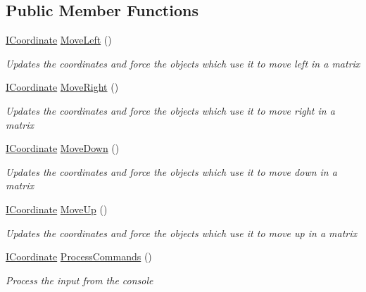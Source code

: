 \subsection*{Public Member Functions}
\begin{DoxyCompactItemize}
\item 
\hyperlink{interface_labyrinth_game_1_1_interfaces_1_1_i_coordinate}{I\+Coordinate} \hyperlink{class_labyrinth_game_1_1_keyboard_command_a19c4c43c956aabf2f1840410e8735cd3}{Move\+Left} ()
\begin{DoxyCompactList}\small\item\em Updates the coordinates and force the objects which use it to move left in a matrix \end{DoxyCompactList}\item 
\hyperlink{interface_labyrinth_game_1_1_interfaces_1_1_i_coordinate}{I\+Coordinate} \hyperlink{class_labyrinth_game_1_1_keyboard_command_a281fa60788d6778b7e157c202574db22}{Move\+Right} ()
\begin{DoxyCompactList}\small\item\em Updates the coordinates and force the objects which use it to move right in a matrix \end{DoxyCompactList}\item 
\hyperlink{interface_labyrinth_game_1_1_interfaces_1_1_i_coordinate}{I\+Coordinate} \hyperlink{class_labyrinth_game_1_1_keyboard_command_af0559dc6b293c70e92f4a49e946c23a3}{Move\+Down} ()
\begin{DoxyCompactList}\small\item\em Updates the coordinates and force the objects which use it to move down in a matrix \end{DoxyCompactList}\item 
\hyperlink{interface_labyrinth_game_1_1_interfaces_1_1_i_coordinate}{I\+Coordinate} \hyperlink{class_labyrinth_game_1_1_keyboard_command_affb746a49aaf2ace462d676046aae8e6}{Move\+Up} ()
\begin{DoxyCompactList}\small\item\em Updates the coordinates and force the objects which use it to move up in a matrix \end{DoxyCompactList}\item 
\hyperlink{interface_labyrinth_game_1_1_interfaces_1_1_i_coordinate}{I\+Coordinate} \hyperlink{class_labyrinth_game_1_1_keyboard_command_a44f06cde013f97e5d35c40485603aab9}{Process\+Commands} ()
\begin{DoxyCompactList}\small\item\em Process the input from the console \end{DoxyCompactList}\end{DoxyCompactItemize}


